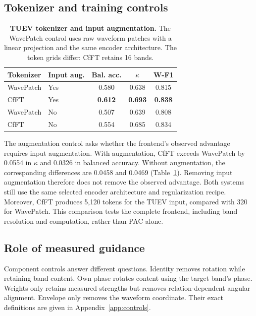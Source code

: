 \documentclass[10pt,twocolumn,letterpaper]{article}
\newcommand{\TableStyle}{\fontsize{8}{9.5}\selectfont\setlength{\tabcolsep}{3pt}\renewcommand{\arraystretch}{1.10}}
\begin{document}
\subsection{Tokenizer and training controls}
\label{sec:training-controls}
\begin{table}[t]
\centering\TableStyle
\caption{\textbf{TUEV tokenizer and input augmentation.} The WavePatch
control uses raw waveform patches with a linear projection and the same
encoder architecture. The token grids differ: CfFT retains 16 bands.}
\label{tab:augmentation}
\begin{tabular*}{\linewidth}{@{\extracolsep{\fill}}llccc@{}}
\toprule
Tokenizer & Input aug. & Bal. acc. & $\kappa$ & W-F1\\
\midrule
WavePatch & Yes & 0.580 & 0.638 & 0.815\\
CfFT & Yes & \textbf{0.612} & \textbf{0.693} & \textbf{0.838}\\
\midrule
WavePatch & No & 0.507 & 0.639 & 0.808\\
CfFT & No & 0.554 & 0.685 & 0.834\\
\bottomrule
\end{tabular*}
\end{table}

The augmentation control asks whether the frontend's observed advantage
requires input augmentation. With augmentation, CfFT exceeds WavePatch
by 0.0554 in $\kappa$ and 0.0326 in balanced accuracy.
Without augmentation, the corresponding differences are 0.0458 and
0.0469 (Table~\ref{tab:augmentation}). Removing input augmentation
therefore does not remove the observed advantage.
Both systems still use the same selected encoder architecture and
regularization recipe. Moreover, CfFT produces 5,120 tokens for the
TUEV input, compared with 320 for WavePatch. This comparison tests the
complete frontend, including band resolution and computation, rather
than PAC alone.

\subsection{Role of measured guidance}
\label{sec:components}
Component controls answer different questions. Identity removes
rotation while retaining band content. Own phase rotates content using
the target band's phase. Weights only retains measured strengths but
removes relation-dependent angular alignment. Envelope only removes the
waveform coordinate. Their exact definitions are given in
Appendix~\ref{app:controls}.
\end{document}
